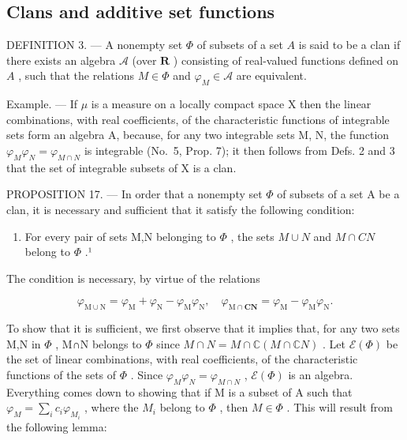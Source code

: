 \subsection{Clans and additive set functions}

DEFINITION 3. --- A nonempty set \(\Phi\) of subsets of a set \(A\) is said to be a clan if there exists an algebra \(\mathcal{A}\) (over \(\mathbf{R}\) ) consisting of real-valued functions defined on \(A\) , such that the relations \(M \in \Phi\) and \(\varphi_{M} \in \mathcal{A}\) are equivalent.

Example. --- If \(\mu\) is a measure on a locally compact space X then the linear combinations, with real coefficients, of the characteristic functions of integrable sets form an algebra A, because, for any two integrable sets M, N, the function \(\varphi_{M}\varphi_{N} = \varphi_{M\cap N}\) is integrable (No.~5, Prop. 7); it then follows from Defs. 2 and 3 that the set of integrable subsets of X is a clan.

PROPOSITION 17. --- In order that a nonempty set \(\Phi\) of subsets of a set A be a clan, it is necessary and sufficient that it satisfy the following condition:

\begin{enumerate}
\def\labelenumi{(\Roman{enumi})}
\setcounter{enumi}{149}
\tightlist
\item
  For every pair of sets M,N belonging to \(\Phi\) , the sets \(M\cup N\) and \(M\cap CN\) belong to \(\Phi\) .¹
\end{enumerate}

The condition is necessary, by virtue of the relations

\[
\varphi_ {\mathrm{M} \cup \mathrm{N}} = \varphi_ {\mathrm{M}} + \varphi_ {\mathrm{N}} - \varphi_ {\mathrm{M}} \varphi_ {\mathrm{N}}, \quad \varphi_ {\mathrm{M} \cap \mathbf {C N}} = \varphi_ {\mathrm{M}} - \varphi_ {\mathrm{M}} \varphi_ {\mathrm{N}}.
\]

To show that it is sufficient, we first observe that it implies that, for any two sets M,N in \(\Phi\) , M∩N belongs to \(\Phi\) since \(M\cap N=M\cap\mathbb{C}(M\cap\mathbb{C}N)\) . Let \(\mathcal{E}(\Phi)\) be the set of linear combinations, with real coefficients, of the characteristic functions of the sets of \(\Phi\) . Since \(\varphi_{M}\varphi_{N}=\varphi_{M\cap N}\) , \(\mathcal{E}(\Phi)\) is an algebra. Everything comes down to showing that if M is a subset of A such that \(\varphi_{M}=\sum_{i}c_{i}\varphi_{M_{i}}\) , where the \(M_{i}\) belong to \(\Phi\) , then \(M\in\Phi\) . This will result from the following lemma:

